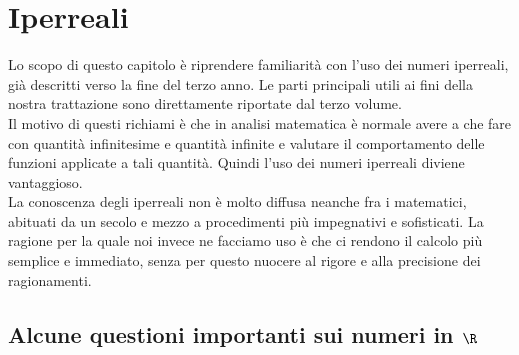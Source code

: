 



\chapter{Iperreali}
\label{sec:01_introduzione}
Lo scopo di questo capitolo è riprendere familiarità con l'uso 
dei numeri iperreali, già descritti verso la fine del terzo anno. 
Le parti principali utili ai fini della nostra trattazione sono 
direttamente riportate dal terzo volume.\\
Il motivo di questi richiami è che in analisi matematica è normale 
avere a che fare con quantità infinitesime e quantità infinite e 
valutare il comportamento delle funzioni applicate a tali quantità. 
Quindi l'uso dei numeri iperreali diviene vantaggioso.\\
La conoscenza degli iperreali non è molto diffusa neanche fra i matematici, 
abituati da un secolo e mezzo a procedimenti più impegnativi e sofisticati.
La ragione per la quale noi invece ne facciamo uso è che ci rendono il calcolo 
più semplice e immediato, senza per questo nuocere al rigore e alla 
precisione dei ragionamenti.

\section{Alcune questioni importanti sui numeri in $\R$}
\label{sec:insnum_reali}

